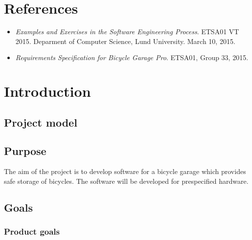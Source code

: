 \documentclass[12pt,titlepage]{article}
\begin{document}


\maketitle
\newpage
\tableofcontents
\thispagestyle{empty}
\setcounter{page}{0}
\newpage



\section{References}
\label{sec:references}

\begin{itemize}
	\item \textit{Examples and Exercises in the Software
		Engineering Process}. ETSA01 VT 2015. Deparment of Computer
		Science, Lund University. March 10, 2015.
	\item \textit{Requirements Specification for Bicycle Garage
		Pro}. ETSA01, Group 33, 2015.
\end{itemize}



\section{Introduction}

\subsection{Project model}

\subsection{Purpose}

The aim of the project is to develop software for a bicycle garage which
provides safe storage of bicycles. The software will be developed for
prespecified hardware.

\subsection{Goals}

\subsubsection{Product goals}
\end{document}

